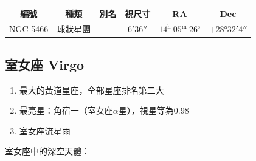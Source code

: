 \begin{center}
\begin{longtable}{c | c | c | c | c | c}
    編號 & 種類 & 別名 & 視尺寸 & RA & Dec \\
    \hline
    \endfirsthead


    \endfoot

    \endlastfoot

    NGC 5466 & 球狀星團 & - & \(\ang{;6;36}\) & \(14^\text{h }05^\text{m }26^\text{s}\) & \(+\ang{28;32;4}\) \\
\end{longtable}
\end{center}

\subsection{室女座 Virgo}
\begin{enumerate}
    \item 最大的黃道星座，全部星座排名第二大
    \item 最亮星：角宿一（室女座\(\alpha\)星），視星等為0.98
    \item 室女座流星雨
\end{enumerate}
室女座中的深空天體：

